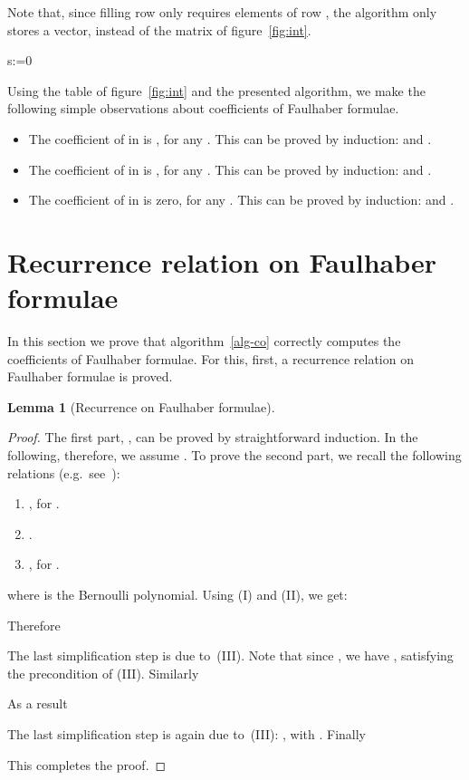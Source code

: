 \documentclass[a4paper,10pt]{amsart}
\newtheorem{lemma}{Lemma}
\theoremstyle{remark}
\begin{document}
Note that, since filling row  only requires elements of row ,
the algorithm only stores a vector, instead of the matrix of
figure~\ref{fig:int}. 


\begin{algorithm}
\caption{Computes coefficients of Faulhaber formulae}
\begin{algorithmic}
\label{alg-co}
\REQUIRE 
\STATE 
\FOR{}
\STATE s:=0
\FOR{}
\STATE 
\STATE 
\ENDFOR
\STATE 
\ENDFOR
\RETURN {}
\end{algorithmic}
\end{algorithm}

Using the table of figure~\ref{fig:int} and the presented algorithm, 
we make the following simple observations about coefficients of
Faulhaber formulae.
\begin{itemize}
\item The coefficient of  in  is , for
any . This can be proved by induction:
 and .
\item The coefficient of  in  is , for any
. This can be proved by induction:
 and .
\item The coefficient of  in  is zero, for any . This can be proved by induction:
 and .
\end{itemize}

\section{Recurrence relation on Faulhaber formulae}
\label{sec:proof}
In this section we prove that algorithm~\ref{alg-co} correctly
computes the coefficients of Faulhaber formulae. For this, first, a
recurrence relation on Faulhaber formulae is proved.


\begin{lemma}[Recurrence on Faulhaber formulae]
\label{main-thm}

\end{lemma}
\begin{proof}
The first part, , can be proved by
straightforward induction. In the following, therefore, we assume
. To prove the second part, we recall the following relations
(e.g.\ see~\cite[chapter 23]{mhandbook}):
\begin{enumerate}[I]
\item , for .
\item 
.
\item
, for .
\end{enumerate}
where  is the  Bernoulli polynomial. 
Using (I) and (II), we get:

Therefore

The last simplification step is due to~(III). Note that since , we
have , satisfying the precondition of (III).
Similarly

As a result

The last simplification step is again due to~(III):
, with .
Finally

This completes the proof.
\end{proof}
\end{document}
